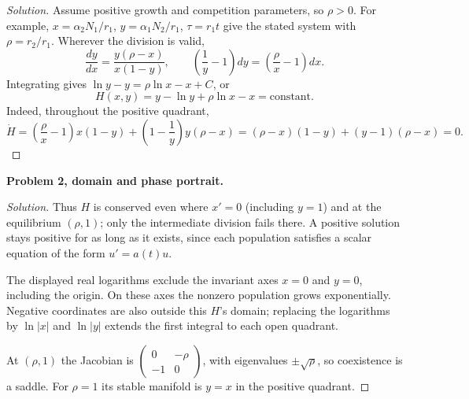 \documentclass[12pt]{amsart}
\theoremstyle{plain}
\theoremstyle{definition}
\theoremstyle{definition}
\theoremstyle{plain}
\newenvironment{solution}
{\begin{proof}[Solution]}
{\end{proof}}
\begin{document}
    \begin{solution}
    Assume positive growth and competition parameters, so $\rho>0$.
    For example, $x=\alpha_2N_1/r_1$, $y=\alpha_1N_2/r_1$,
    $\tau=r_1t$ give the stated system with $\rho=r_2/r_1$.
    Wherever the division is valid,
    \[
      \frac{dy}{dx}=\frac{y(\rho-x)}{x(1-y)},\qquad
      \left(\frac1y-1\right)dy=\left(\frac\rho x-1\right)dx.
    \]
    Integrating gives $\ln y-y=\rho\ln x-x+C$, or
    \[
      \boxed{H(x,y)=y-\ln y+\rho\ln x-x=\text{constant}.}
    \]
    Indeed, throughout the positive quadrant,
    \[
    \dot H=\left(\frac\rho x-1\right)x(1-y)
       +\left(1-\frac1y\right)y(\rho-x)
       =(\rho-x)(1-y)+(y-1)(\rho-x)=0.
    \]
    \end{solution}
    \clearpage
    \noindent\textbf{Problem 2, domain and phase portrait.}
    \begin{solution}
    Thus $H$ is conserved even where $x'=0$ (including $y=1$) and
    at the equilibrium $(\rho,1)$; only the intermediate division fails there.
    A positive solution stays positive for as long as it exists, since each
    population satisfies a scalar equation of the form $u'=a(t)u$.

    The displayed real logarithms exclude the invariant axes $x=0$ and $y=0$,
    including the origin. On these axes the nonzero population grows
    exponentially. Negative coordinates are also outside this $H$'s domain;
    replacing the logarithms by $\ln|x|$ and $\ln|y|$ extends the first integral
    to each open quadrant.

    At $(\rho,1)$ the Jacobian is
    $\left(\begin{smallmatrix}0&-\rho\\-1&0\end{smallmatrix}\right)$,
    with eigenvalues $\pm\sqrt\rho$, so coexistence is a saddle.
    For $\rho=1$ its stable manifold is $y=x$ in the positive quadrant.
    \end{solution}
\end{document}
